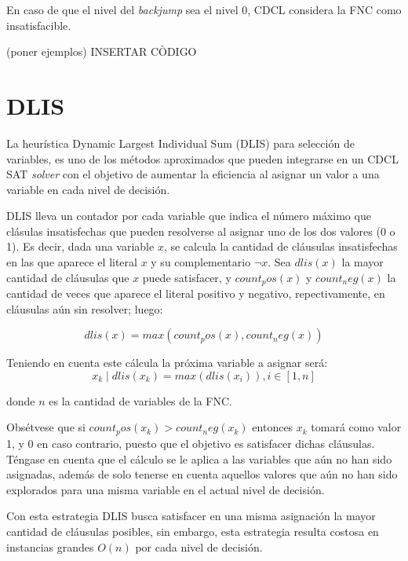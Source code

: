 En caso de que el nivel del \textit{backjump} sea el nivel 0, CDCL considera la FNC como insatisfacible.

(poner ejemplos) INSERTAR C\`ODIGO

\section{DLIS}
La heurística Dynamic Largest Individual Sum (DLIS) para selección de variables, es uno de los métodos aproximados que pueden integrarse en un CDCL SAT \textit{solver} con el objetivo de aumentar la eficiencia al asignar un valor a una variable en cada nivel de decisión.

DLIS lleva un contador por cada variable que indica el número máximo que clásulas insatisfechas que pueden resolverse al asignar uno de los dos valores (0 o 1). Es decir, dada una variable $x$, se calcula la cantidad de cláusulas insatisfechas en las que aparece el literal $x$ y su complementario $\neg x$. Sea $dlis(x)$ la mayor cantidad de cláusulas que $x$ puede satisfacer, y $count_pos(x)$ y $count_neg(x)$ la cantidad de veces que aparece el literal positivo y negativo, repectivamente, en cláusulas aún sin resolver; luego:

\begin{equation*}
dlis(x)=max(count_pos(x), count_neg(x))
\end{equation*}

Teniendo en cuenta este cálcula la próxima variable a asignar será:
\begin{equation*}
x_k \mid dlis(x_k)=max(dlis(x_i)), i \in [1,n]
\end{equation*}

donde $n$ es la cantidad de variables de la FNC.

Obsétvese que si $count_pos(x_k) > count_neg(x_k)$ entonces $x_k$ tomará como valor 1, y 0 en caso contrario, puesto que el objetivo es satisfacer dichas cláusulas. Téngase en cuenta que el cálculo se le aplica a las variables que aún no han sido asignadas, además de solo tenerse en cuenta aquellos valores que aún no han sido explorados para una misma variable en el actual nivel de decisión.


Con esta estrategia DLIS busca satisfacer en una misma asignación la mayor cantidad de cláusulas posibles, sin embargo, esta estrategia resulta costosa en instancias grandes $O(n)$ por cada nivel de decisión.

